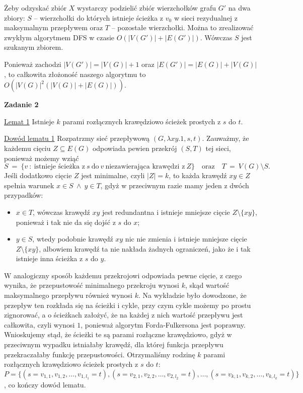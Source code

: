\documentclass[12pt]{article}
\begin{document}
	\medskip
	
	Żeby odzyskać zbiór \(X\) wystarczy podzielić zbiór wierzchołków grafu
	\(G'\) na dwa zbiory: \(S\) -- wierzchołki do których istnieje ścieżka
	z \(v_{0}\) w sieci rezydualnej z maksymalnym przepływem oraz \(T\) --
	pozostałe wierzchołki. Można to zrealizować zwykłym algorytmem DFS w czasie
	\(O \left( |V(G')| + |E(G')| \right)\). Wówczas \(S\) jest szukanym zbiorem.
	
	\medskip
	
	Ponieważ zachodzi \(|V(G')| = |V(G)| + 1\) oraz \(|E(G')| = |E(G)| +
	|V(G)|\), to całkowita złożoność naszego algorytmu to \(O \left( |V(G)|^{2}
	(|V(G)| + |E(G)|) \right)\).
	
	\newpage
	
	\textbf{Zadanie 2}
	
	\medskip
	
	\underline{Lemat 1} Istnieje \(k\) parami rozłącznych krawędziowo ścieżek
	prostych z \(s\) do \(t\).
	
	\medskip
	
	\underline{Dowód lematu 1} Rozpatrzmy sieć przepływową \((G, \lambda xy . 1,
	s, t)\). Zauważmy, że każdemu cięciu \(Z \subseteq E(G)\) odpowiada pewien
	przekrój \((S, T)\) tej sieci, ponieważ możemy wziąć
	\[ S \ = \ \{ v \ : \ \text{istnieje ścieżka z} \ s \ \text{do} \ v \
	\text{niezawierająca krawędzi z} \ Z\} \quad \text{oraz} \quad T \ = \ V(G)
	\setminus S \text{.} \]
	Jeśli dodatkowo cięcie \(Z\) jest minimalne, czyli \(|Z| = k\), to każda
	krawędź \(xy \in Z\) spełnia warunek \(x \in S \ \wedge \ y \in T\), gdyż
	w przeciwnym razie mamy jeden z dwóch przypadków:
	\begin{itemize}
		\item \(x \in T\), wówczas krawędź \(xy\) jest redundantna i istnieje
		mniejsze cięcie \(Z \setminus \{xy\}\), ponieważ i tak nie da się dojść
		z \(s\) do \(x\);
		\item \(y \in S\), wtedy podobnie krawędź \(xy\) nic nie zmienia i
		istnieje mniejsze cięcie \(Z \setminus \{xy\}\), albowiem krawędź ta nie
		nakłada żadnych ograniczeń, jako że i tak istnieje inna ścieżka z \(s\)
		do \(y\).
	\end{itemize}
	W analogiczny sposób każdemu przekrojowi odpowiada pewne cięcie, z czego
	wynika, że przepustowość minimalnego przekroju wynosi \(k\), skąd wartość
	maksymalnego przepływu również wynosi \(k\). Na wykładzie było dowodzone, że
	przepływ ten rozkłada się na ścieżki i cykle, przy czym cykle możemy po
	prostu zignorować, a o ścieżkach założyć, że na każdej z nich wartość
	przepływu jest całkowita, czyli wynosi \(1\), ponieważ algorytm
	Forda-Fulkersona jest poprawny. Wnioskujemy stąd, że ścieżki te są parami
	rozłączne krawędziowo, gdyż w przeciwnym wypadku istniałaby krawędź, dla
	której funkcja przepływu przekraczałaby funkcję przepustowości. Otrzymaliśmy
	rodzinę \(k\) parami rozłącznych krawędziowo ścieżek prostych z \(s\) do
	\(t\): \(P = \{(s = v_{1, 1}, v_{1, 2}, \ldots, v_{1, l_{1}} = t), (s =
	v_{2, 1}, v_{2, 2}, \ldots, v_{2, l_{2}} = t), \ldots, (s = v_{k, 1}, v_{k,
	2}, \ldots, v_{k, l_{k}} = t)\}\), co kończy dowód lematu.
	
\end{document}
